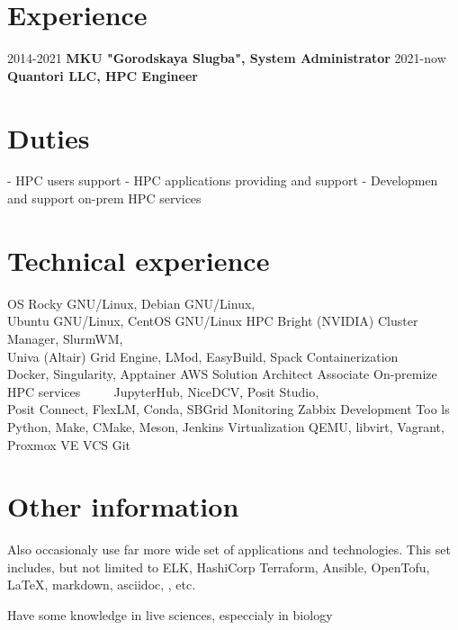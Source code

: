 \documentclass[]{twentysecondcv}
\begin{document}
\section{Experience}
\begin{twentyshort}
  \twentyitemshort
    {2014-2021}
    {\textbf{MKU "Gorodskaya Slugba", System Administrator}}
    \twentyitemshort
    {2021-now}
    {\textbf{Quantori LLC, HPC Engineer}}
\end{twentyshort}

\section{Duties}
\begin{twentyshort}
  \twentyitemshort
    {-}
    {HPC users support}
  \twentyitemshort
    {-}
    {HPC applications providing and support }
   \twentyitemshort
    {-}
    {Developmen and support on-prem HPC services}
\end{twentyshort}

\section{Technical experience}
\begin{twentyshort}
  \twentyitemshort
    {OS}
    {Rocky GNU/Linux, Debian GNU/Linux, \\ Ubuntu GNU/Linux, CentOS GNU/Linux}
  \twentyitemshort
    {HPC}
    {Bright (NVIDIA) Cluster Manager, SlurmWM, \\ Univa (Altair) Grid Engine, LMod, EasyBuild, Spack }
  \twentyitemshort
    {Containerization\ \ \  }
    {Docker, Singularity, Apptainer}
   \twentyitemshort
    {AWS}
    {Solution Architect Associate}
    \twentyitemshort
    {On-premize HPC services \ \ \ \ }
    {JupyterHub, NiceDCV, Posit Studio,\\ Posit Connect, FlexLM, Conda, SBGrid}
    \twentyitemshort
    {Monitoring}
    {Zabbix}
    \twentyitemshort
    {Development Too ls}
    {Python, Make, CMake, Meson, Jenkins}
    \twentyitemshort
    {Virtualization}
    {QEMU, libvirt, Vagrant, Proxmox VE}
    \twentyitemshort
    {VCS}
    {Git}
\end{twentyshort}


\section{Other information}
Also occasionaly use far more wide set of applications and technologies. This set includes, but not limited to ELK, HashiCorp Terraform, Ansible, OpenTofu,  \LaTeX, markdown, asciidoc, , etc.

Have some knowledge in live sciences, especcialy in biology

\end{document}
